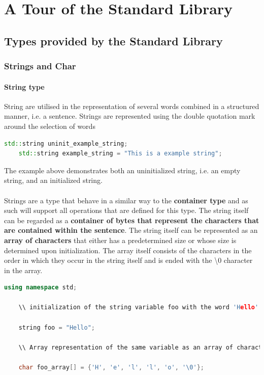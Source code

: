 \chapter{A Tour of the Standard Library}

\section{Types provided by the Standard Library}

\subsection{Strings and Char}

\subsubsection{String type}

String are utilised in the representation of several words combined in a structured manner, i.e. a sentence.
Strings are represented using the double quotation mark around the selection of words 


\begin{lstlisting}[language=C++]
    std::string uninit_example_string;
    std::string example_string = "This is a example string";
\end{lstlisting}

The example above demonstrates both an uninitialized string, i.e. an empty string, and an initialized string.
\\\\
Strings are a type that behave in a similar way to the \textbf{container type} and as such will support all operations that are defined for this type.
The string itself can be regarded as a \textbf{container of bytes that represent the characters that are contained within the sentence}. The string itself can be represented as an \textbf{array of characters} that either has a predetermined size or whose size is determined upon initialization.
The array itself consists of the characters in the order in which they occur in the string itself and is ended with the \textbackslash0 character in the array.

\newpage
\begin{lstlisting}[language=C++]
    using namespace std;

    \\ initialization of the string variable foo with the word 'Hello'

    string foo = "Hello";
    
    \\ Array representation of the same variable as an array of characters that has an undefined length through the use of the square brackets
    
    char foo_array[] = {'H', 'e', 'l', 'l', 'o', '\0'};
\end{lstlisting}

